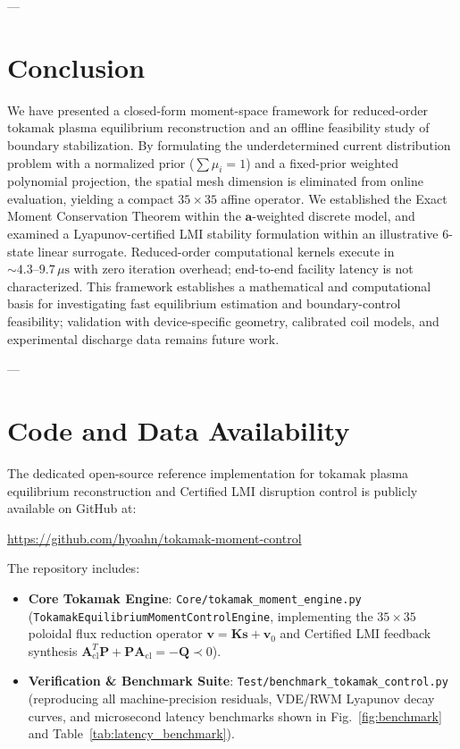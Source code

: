 \documentclass[11pt,a4paper]{article}
\begin{document}
---

\section{Conclusion}
We have presented a closed-form moment-space framework for reduced-order tokamak plasma equilibrium reconstruction and an offline feasibility study of boundary stabilization. By formulating the underdetermined current distribution problem with a normalized prior ($\sum \mu_i = 1$) and a fixed-prior weighted polynomial projection, the spatial mesh dimension is eliminated from online evaluation, yielding a compact $35 \times 35$ affine operator. We established the Exact Moment Conservation Theorem within the $\bm{a}$-weighted discrete model, and examined a Lyapunov-certified LMI stability formulation within an illustrative 6-state linear surrogate. Reduced-order computational kernels execute in ${\sim}4.3\text{--}9.7\,\mu\mathrm{s}$ with zero iteration overhead; end-to-end facility latency is not characterized. This framework establishes a mathematical and computational basis for investigating fast equilibrium estimation and boundary-control feasibility; validation with device-specific geometry, calibrated coil models, and experimental discharge data remains future work.

---

\section*{Code and Data Availability}
The dedicated open-source reference implementation for tokamak plasma equilibrium reconstruction and Certified LMI disruption control is publicly available on GitHub at:
\begin{center}
    \url{https://github.com/hyoahn/tokamak-moment-control}
\end{center}
The repository includes:
{\sloppy
\begin{itemize}
    \item \textbf{Core Tokamak Engine}: \texttt{Core/\allowbreak tokamak\_\allowbreak moment\_\allowbreak engine.py} (\texttt{Tokamak\allowbreak Equilibrium\allowbreak Moment\allowbreak Control\allowbreak Engine}, implementing the $35 \times 35$ poloidal flux reduction operator $\bm{v} = \bm{K}\bm{s} + \bm{v}_0$ and Certified LMI feedback synthesis $\bm{A}_{\mathrm{cl}}^T \bm{P} + \bm{P} \bm{A}_{\mathrm{cl}} = -\bm{Q} \prec 0$).
    \item \textbf{Verification \& Benchmark Suite}: \texttt{Test/\allowbreak benchmark\_\allowbreak tokamak\_\allowbreak control.py} (reproducing all machine-precision residuals, VDE/RWM Lyapunov decay curves, and microsecond latency benchmarks shown in Fig.~\ref{fig:benchmark} and Table~\ref{tab:latency_benchmark}).
\end{itemize}
}
\end{document}

